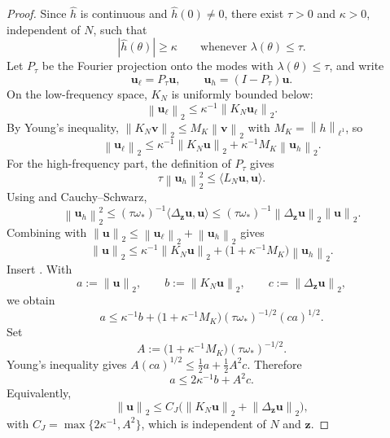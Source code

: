 \documentclass[10pt,a4paper]{amsart}
\newcommand{\bu}{{\bm{u}}}
\newcommand{\bv}{{\bm{v}}}
\newcommand{\bz}{{\bm{z}}}
\newcommand{\norm}[1]{\left\lVert #1 \right\rVert}
\begin{document}
\begin{proof}
Since $\widehat h$ is continuous and $\widehat h(0)\ne0$, there exist $\tau>0$ and $\kappa>0$, independent of $N$, such that
\[
|\widehat h(\theta)|\ge \kappa
\qquad\text{whenever }\lambda(\theta)\le\tau.
\]
Let $P_\tau$ be the Fourier projection onto the modes with $\lambda(\theta)\le\tau$, and write
\[
\bu_\ell=P_\tau\bu,
\qquad
\bu_h=(I-P_\tau)\bu.
\]
On the low-frequency space, $K_N$ is uniformly bounded below:
\[
\norm{\bu_\ell}_2\le \kappa^{-1}\norm{K_N\bu_\ell}_2.
\]
By Young's inequality, $\norm{K_N\bv}_2\le M_K\norm{\bv}_2$ with $M_K=\norm{h}_{\ell^1}$, so
\begin{equation}\label{eq:low-bound-blur}
\norm{\bu_\ell}_2
\le \kappa^{-1}\norm{K_N\bu}_2+\kappa^{-1}M_K\norm{\bu_h}_2.
\end{equation}
For the high-frequency part, the definition of $P_\tau$ gives
\[
\tau\norm{\bu_h}_2^2\le \langle L_N\bu,\bu\rangle.
\]
Using  and Cauchy--Schwarz,
\begin{equation}\label{eq:high-bound-blur}
\norm{\bu_h}_2^2
\le (\tau\omega_*)^{-1}\langle\Delta_\bz\bu,\bu\rangle
\le (\tau\omega_*)^{-1}\norm{\Delta_\bz\bu}_2\norm{\bu}_2.
\end{equation}
Combining  with $\norm{\bu}_2\le\norm{\bu_\ell}_2+\norm{\bu_h}_2$ gives
\[
\norm{\bu}_2
\le \kappa^{-1}\norm{K_N\bu}_2
+\bigl(1+\kappa^{-1}M_K\bigr)\norm{\bu_h}_2.
\]
Insert . With
\[
a:=\norm{\bu}_2,
\qquad b:=\norm{K_N\bu}_2,
\qquad c:=\norm{\Delta_\bz\bu}_2,
\]
we obtain
\[
a\le \kappa^{-1}b+
\bigl(1+\kappa^{-1}M_K\bigr)(\tau\omega_*)^{-1/2}(ca)^{1/2}.
\]
Set
\[
A:=\bigl(1+\kappa^{-1}M_K\bigr)(\tau\omega_*)^{-1/2}.
\]
Young's inequality gives $A(ca)^{1/2}\le \frac12 a+\frac12 A^2c$. Therefore
\[
a\le 2\kappa^{-1}b+A^2c.
\]
Equivalently,
\[
\norm{\bu}_2\le C_J\bigl(\norm{K_N\bu}_2+\norm{\Delta_\bz\bu}_2\bigr),
\]
with $C_J=\max\{2\kappa^{-1},A^2\}$, which is independent of $N$ and $\bz$.
\end{proof}
\end{document}

